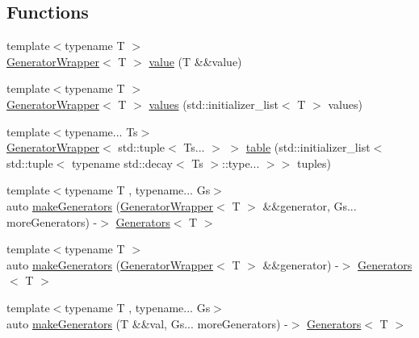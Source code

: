 \subsection*{Functions}
\begin{DoxyCompactItemize}
\item 
{\footnotesize template$<$typename T $>$ }\\\mbox{\hyperlink{class_catch_1_1_generators_1_1_generator_wrapper}{Generator\+Wrapper}}$<$ T $>$ \mbox{\hyperlink{namespace_catch_1_1_generators_a3c4989dd0dca44455f55484cedaa18da}{value}} (T \&\&value)
\item 
{\footnotesize template$<$typename T $>$ }\\\mbox{\hyperlink{class_catch_1_1_generators_1_1_generator_wrapper}{Generator\+Wrapper}}$<$ T $>$ \mbox{\hyperlink{namespace_catch_1_1_generators_a55ca9a1132e662d9603c516161dcae35}{values}} (std\+::initializer\+\_\+list$<$ T $>$ values)
\item 
{\footnotesize template$<$typename... Ts$>$ }\\\mbox{\hyperlink{class_catch_1_1_generators_1_1_generator_wrapper}{Generator\+Wrapper}}$<$ std\+::tuple$<$ Ts... $>$ $>$ \mbox{\hyperlink{namespace_catch_1_1_generators_a6e0436ad4eddeabdc34281119201dbfe}{table}} (std\+::initializer\+\_\+list$<$ std\+::tuple$<$ typename std\+::decay$<$ Ts $>$\+::type... $>$$>$ tuples)
\item 
{\footnotesize template$<$typename T , typename... Gs$>$ }\\auto \mbox{\hyperlink{namespace_catch_1_1_generators_adabbca9c7049bd8b5dd0474240108485}{make\+Generators}} (\mbox{\hyperlink{class_catch_1_1_generators_1_1_generator_wrapper}{Generator\+Wrapper}}$<$ T $>$ \&\&generator, Gs... more\+Generators) -\/$>$ \mbox{\hyperlink{class_catch_1_1_generators_1_1_generators}{Generators}}$<$ T $>$
\item 
{\footnotesize template$<$typename T $>$ }\\auto \mbox{\hyperlink{namespace_catch_1_1_generators_abefb1a0fab3c669b98a53037b3286d22}{make\+Generators}} (\mbox{\hyperlink{class_catch_1_1_generators_1_1_generator_wrapper}{Generator\+Wrapper}}$<$ T $>$ \&\&generator) -\/$>$ \mbox{\hyperlink{class_catch_1_1_generators_1_1_generators}{Generators}}$<$ T $>$
\item 
{\footnotesize template$<$typename T , typename... Gs$>$ }\\auto \mbox{\hyperlink{namespace_catch_1_1_generators_a0497b4463b7afee28df49631d6d75e83}{make\+Generators}} (T \&\&val, Gs... more\+Generators) -\/$>$ \mbox{\hyperlink{class_catch_1_1_generators_1_1_generators}{Generators}}$<$ T $>$
$$
\end{DoxyCompactItemize}
